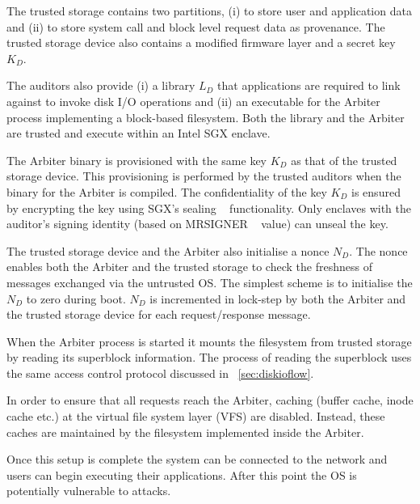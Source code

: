 \documentclass[withindex,glossary]{cam-thesis}
\begin{document}
The trusted storage contains two partitions,
(i) to store user and application data and
(ii) to store system call and block level request data as provenance.
The trusted storage device also contains a modified firmware layer and a secret key $K_D$.

The auditors also provide 
(i) a library $L_D$ that applications are required to link against to invoke disk I/O operations and
(ii) an executable for the Arbiter process implementing a block-based filesystem.
Both the library and the Arbiter are trusted and execute within an Intel SGX enclave.

The Arbiter binary is provisioned with the same key $K_D$ as that of the trusted storage device.
This provisioning is performed by the trusted auditors when the binary for the Arbiter is compiled.
The confidentiality of the key $K_D$ is ensured by encrypting the key using SGX's sealing ~\cite{sgxsealing} functionality.
Only enclaves with the auditor's signing identity (based on MRSIGNER ~\cite{mrsigner} value) can unseal the key.

The trusted storage device and the Arbiter also initialise a nonce $N_D$.
The nonce enables both the Arbiter and the trusted storage to check the freshness of messages exchanged via the untrusted OS.
The simplest scheme is to initialise the $N_D$ to zero during boot.
$N_D$ is incremented in lock-step by both the Arbiter and the trusted storage device for each request/response message.

When the Arbiter process is started it mounts the filesystem from trusted storage by reading its superblock information.
The process of reading the superblock uses the same access control protocol discussed in ~\ref{sec:diskioflow}.

In order to ensure that all requests reach the Arbiter, caching (buffer cache, inode cache etc.) at the virtual file system layer (VFS) are disabled.
Instead, these caches are maintained by the filesystem implemented inside the Arbiter.

Once this setup is complete the system can be connected to the network and users can begin executing their applications.
After this point the OS is potentially vulnerable to attacks.

\end{document}
